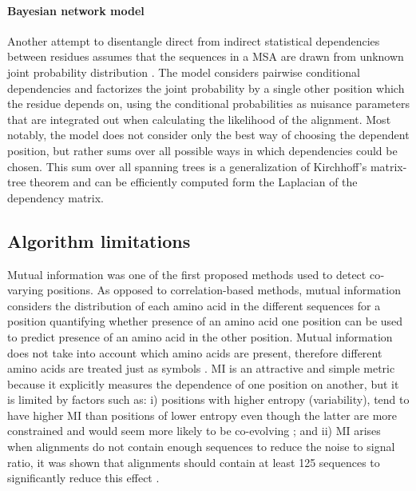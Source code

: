 \paragraph{Bayesian network model}
Another attempt to disentangle direct from indirect statistical dependencies between residues assumes that the sequences in a MSA are drawn from unknown joint probability distribution \cite{burger2010disentangling}. 
The model considers pairwise conditional dependencies and factorizes the joint probability by a single other position which the residue depends on, using the conditional probabilities as nuisance parameters that are integrated out when calculating the likelihood of the alignment. 
Most notably, the model does not consider only the best way of choosing the dependent position, but rather sums over all possible ways in which dependencies could be chosen.
This sum over all spanning trees is a generalization of Kirchhoff's matrix-tree theorem and can be efficiently computed form the Laplacian of the dependency matrix.

\subsection{Algorithm limitations}


Mutual information was one of the first proposed methods used to detect co‐varying positions. 
As opposed to correlation-based methods, mutual information considers the distribution of each amino acid in the different sequences for a position quantifying whether presence of an amino acid one position can be used to predict presence of an amino acid in the other position.
Mutual information does not take into account which amino acids are present, therefore different amino acids are treated just as symbols \cite{de2013emerging}.
MI is an attractive and simple metric because it explicitly measures the dependence of one position on another, but it is limited by factors such as: 
i) positions with higher entropy (variability), tend to have higher MI than positions of lower entropy even though the latter are more constrained and would seem more likely to be co-evolving \cite{dunn2008mutual}; and 
ii) MI arises when alignments do not contain enough sequences to reduce the noise to signal ratio, it was shown that alignments should contain at least 125 sequences to significantly reduce this effect \cite{martin2005using}.

